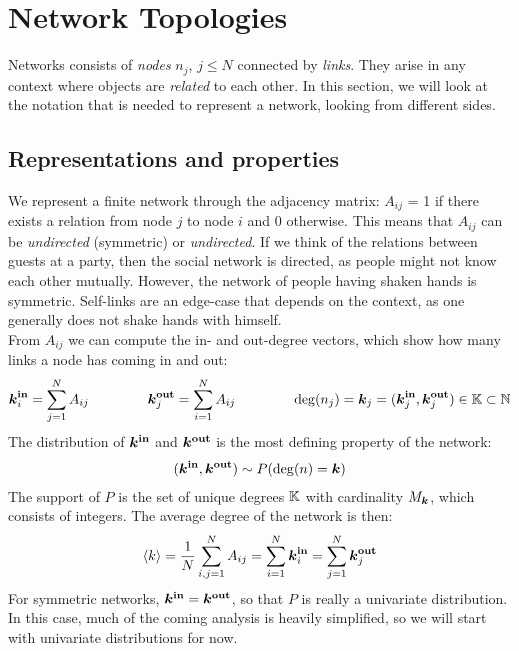 \newpage
\section{Network Topologies} \label{sec:NetworkTopologies}

Networks consists of \textsl{nodes} $n_j$, $j \leq N$ connected by \textsl{links}. They arise in any context where objects are \textsl{related} to each other. In this section, we will look at the notation that is needed to represent a network, looking from different sides. 

\subsection{Representations and properties}
We represent a finite network through the adjacency matrix: $A_{ij} $ = 1 if there exists a relation from node $j$ to node $i$ and 0 otherwise. This means that $A_{ij}$ can be \textsl{undirected} (symmetric) or \textsl{undirected}. If we think of the relations between guests at a party, then the social network is directed, as people might not know each other mutually. However, the network of people having shaken hands is symmetric. Self-links are an edge-case that depends on the context, as one generally does not shake hands with himself. \\
From $A_{ij}$ we can compute the in- and out-degree vectors, which show how many links a node has coming in and out:
\begin{align}
\kinbi = \sum_{j=1}^{N} A_{i j} \hspace{15mm} \koutbj = \sum_{i=1}^{N} A_{i j}  \hspace{15mm} \degree(n_j) = \k_j = (\boldsymbol{k}_j^{\bf in}, \koutbj) \in \K \subset \mathbb{N} \label{eq:definekinkoutfromA} 
\end{align}
The distribution of ${\boldsymbol{k^{\rm in}}}$ and $\boldsymbol{{k^{\rm out}}}$ is the most defining property of the network:
\begin{align}
({\boldsymbol{k^{\rm in}}}, \boldsymbol{{k^{\rm out}}}) \sim P({\rm deg}(n) = {\boldsymbol{k}}) \label{eq:definekinkoutfromP} \end{align}
The support of $P$ is the set of unique degrees ${\mathbb{K}}$ with cardinality $M_{\boldsymbol{k}}$, which consists of integers. The average degree of the network is then: 
\begin{align}
{\langle k\rangle} = \frac{1}{N} \sum_{i,j=1}^{N} A_{ij} = \sum_{i=1}^{N} {\boldsymbol{k}_i^{\bf in}} = \sum_{j=1}^{N} {\boldsymbol{k}_j^{\bf out}} \label{eq:kmean} 
\end{align}
For symmetric networks, ${\boldsymbol{k^{\rm in}}} = \boldsymbol{{k^{\rm out}}}$, so that $P$ is really a univariate distribution. In this case, much of the coming analysis is heavily simplified, so we will start with univariate distributions for now.


